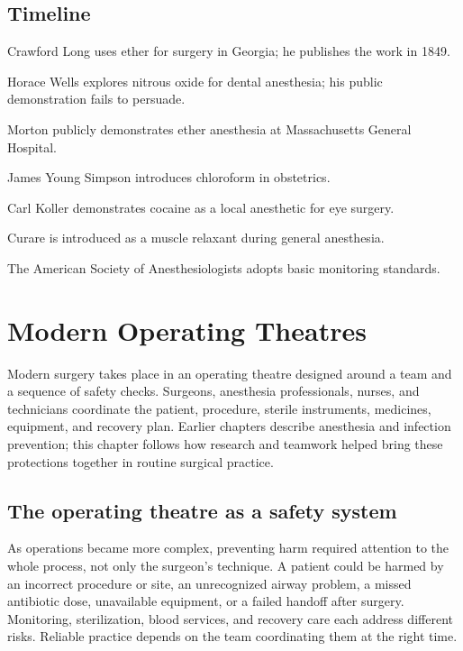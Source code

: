 \documentclass[12pt,oneside]{book}
\begin{document}
\section*{Timeline}
\begin{description}[leftmargin=2.3cm,style=nextline]
  \item[1842] Crawford Long uses ether for surgery in Georgia; he publishes the work in 1849.
  \item[1844--1845] Horace Wells explores nitrous oxide for dental anesthesia; his public demonstration fails to persuade.
  \item[1846] Morton publicly demonstrates ether anesthesia at Massachusetts General Hospital.
  \item[1847] James Young Simpson introduces chloroform in obstetrics.
  \item[1884] Carl Koller demonstrates cocaine as a local anesthetic for eye surgery.
  \item[1942] Curare is introduced as a muscle relaxant during general anesthesia.
  \item[1986] The American Society of Anesthesiologists adopts basic monitoring standards.
\end{description}
\chapter[Modern Operating Theatres]{Modern Operating Theatres}

Modern surgery takes place in an operating theatre designed around a team and
a sequence of safety checks. Surgeons, anesthesia professionals, nurses, and
technicians coordinate the patient, procedure, sterile instruments, medicines,
equipment, and recovery plan. Earlier chapters describe anesthesia and
infection prevention; this chapter follows how research and teamwork helped
bring these protections together in routine surgical practice.

\section{The operating theatre as a safety system}
As operations became more complex, preventing harm required attention to the
whole process, not only the surgeon's technique. A patient could be harmed by
an incorrect procedure or site, an unrecognized airway problem, a missed
antibiotic dose, unavailable equipment, or a failed handoff after surgery.
Monitoring, sterilization, blood services, and recovery care each address
different risks. Reliable practice depends on the team coordinating them at
the right time.
\end{document}
